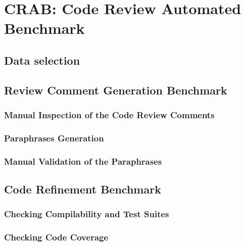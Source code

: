\section{CRAB: Code Review Automated Benchmark}


\subsection{Data selection}


\subsection{Review Comment Generation Benchmark}

\subsubsection{Manual Inspection of the Code Review Comments}
\subsubsection{Paraphrases Generation}
\subsubsection{Manual Validation of the Paraphrases}


\subsection{Code Refinement Benchmark}


\subsubsection{Checking Compilability and Test Suites}

\subsubsection{Checking Code Coverage}
